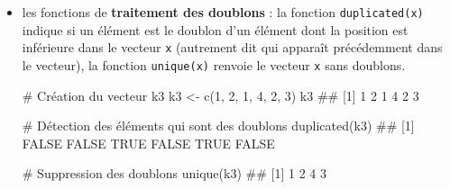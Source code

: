 \documentclass[12pt,twosided, notitlepage]{book}
\newenvironment{Shaded}{}{}
\newcommand{\KeywordTok}[1]{\textcolor[rgb]{0.00,0.00,1.00}{#1}}
\newcommand{\DecValTok}[1]{#1}
\newcommand{\StringTok}[1]{\textcolor[rgb]{0.00,0.50,0.50}{#1}}
\newcommand{\CommentTok}[1]{\textcolor[rgb]{0.00,0.50,0.00}{#1}}
\newcommand{\NormalTok}[1]{#1}
\renewenvironment{Shaded}{\begin{snugshade}}{\end{snugshade}}
\begin{document}
\begin{itemize}
\item
  les fonctions de \textbf{traitement des doublons} : la fonction
  \texttt{duplicated(x)} indique si un
  élément est le doublon d'un élément dont la position est inférieure
  dans le vecteur \texttt{x} (autrement dit qui apparaît précédemment
  dans le vecteur), la fonction
  \texttt{unique(x)} renvoie le vecteur
  \texttt{x} sans doublons.

\begin{Shaded}
\begin{Highlighting}[]
\CommentTok{# Création du vecteur k3}
\NormalTok{k3 <-}\StringTok{ }\KeywordTok{c}\NormalTok{(}\DecValTok{1}\NormalTok{, }\DecValTok{2}\NormalTok{, }\DecValTok{1}\NormalTok{, }\DecValTok{4}\NormalTok{, }\DecValTok{2}\NormalTok{, }\DecValTok{3}\NormalTok{)}
\NormalTok{k3}
\NormalTok{  ## [1] 1 2 1 4 2 3}

\CommentTok{# Détection des éléments qui sont des doublons}
\KeywordTok{duplicated}\NormalTok{(k3)}
\NormalTok{  ## [1] FALSE FALSE  TRUE FALSE  TRUE FALSE}

\CommentTok{# Suppression des doublons}
\KeywordTok{unique}\NormalTok{(k3)}
\NormalTok{  ## [1] 1 2 4 3}
\end{Highlighting}
\end{Shaded}
\end{itemize}

~
\end{document}
